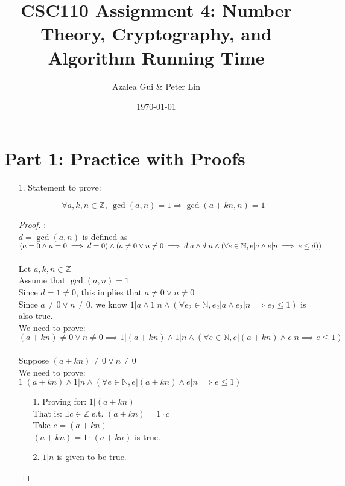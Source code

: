 \documentclass[fontsize=11pt]{article}
\title{CSC110 Assignment 4: Number Theory, Cryptography, and Algorithm Running Time}
\author{Azalea Gui \& Peter Lin}
\date{\today}
\newcommand{\N}{\mathbb{N}}
\newcommand{\Z}{\mathbb{Z}}
\begin{document}
\maketitle

\section*{Part 1: Practice with Proofs}

\begin{enumerate}

\item[1.] Statement to prove:

$$\forall a, k, n \in \Z,~ \gcd(a, n) = 1 \Rightarrow \gcd(a + kn, n) = 1$$

\begin{proof} : \\
$d = \gcd(a,n)$ is defined as $(a=0 \land n=0 \implies d=0) \land \\ (a \neq 0 \lor n \neq 0 \implies d | a \land d | n \land (\forall e \in \N, e | a \land e | n \implies e \le d))$ \\ 
\\
Let $a,k,n \in \Z$ \\
Assume that $\gcd(a,n) = 1$ \\
Since $d = 1 \neq 0$, this implies that $a \neq 0 \lor n \neq 0$ \\
Since $a \neq 0 \lor n \neq 0$, we know $1 | a \land 1 | n \land (\forall e_2 \in \N, e_2 | a \land e_2 | n \implies e_2 \le 1)$ is also true. \\
We need to prove: $(a + kn) \neq 0 \lor n \neq 0 \implies 1 | (a + kn) \land 1 | n \land (\forall e \in \N, e | (a + kn) \land e | n \implies e \le 1)$ \\ 
\\
Suppose $(a + kn) \neq 0 \lor n \neq 0$ \\
We need to prove: $1 | (a + kn) \land 1 | n \land (\forall e \in \N, e | (a + kn) \land e | n \implies e \le 1)$

\begin{enumerate}
    \item[1.] Proving for: $1 | (a + kn)$ \\
        That is: $\exists c \in \Z$ s.t. $(a + kn) = 1 \cdot c$ \\
        Take $c = (a + kn)$ \\
        $(a + kn) = 1 \cdot (a + kn)$ is true.
    
    \item[2.] $1 | n$ is given to be true.
    

\end{enumerate}
\end{proof}
\end{enumerate}
\end{document}
